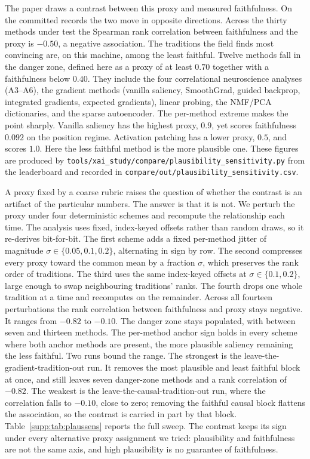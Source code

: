 The paper draws a contrast between this proxy and measured faithfulness. On the committed
records the two move in opposite directions. Across the thirty methods under test the Spearman
rank correlation between faithfulness and the proxy is $-0.50$, a negative association.
The traditions the field finds most convincing are, on this machine, among the least faithful.
Twelve methods fall in the danger zone, defined here as a proxy of at least $0.70$ together
with a faithfulness below $0.40$. They include the four correlational neuroscience analyses
(A3--A6), the gradient methods (vanilla saliency, SmoothGrad, guided backprop, integrated
gradients, expected gradients), linear probing, the NMF/PCA dictionaries, and the sparse
autoencoder. The per-method extreme
makes the point sharply. Vanilla saliency has the highest proxy, $0.9$, yet scores faithfulness
$0.092$ on the position regime. Activation patching has a lower proxy, $0.5$, and scores $1.0$.
Here the less faithful method is the more plausible one. These figures are produced by
\texttt{tools/xai\_study/compare/plausibility\_sensitivity.py} from the leaderboard and
recorded in \texttt{compare/out/plausibility\_sensitivity.csv}.

A proxy fixed by a coarse rubric raises the question of whether the contrast is an artifact of
the particular numbers. The answer is that it is not. We perturb the proxy under four
deterministic schemes and recompute the relationship each time. The analysis uses fixed,
index-keyed offsets rather than random draws, so it re-derives bit-for-bit. The first scheme
adds a fixed per-method jitter of magnitude $\sigma\in\{0.05,0.1,0.2\}$, alternating in sign by
row. The second compresses every proxy toward the common mean by a fraction $\sigma$, which
preserves the rank order of traditions. The third uses the same index-keyed offsets at
$\sigma\in\{0.1,0.2\}$, large enough to swap neighbouring traditions' ranks. The fourth drops
one whole tradition at a time and recomputes on the remainder. Across all fourteen
perturbations the rank correlation between faithfulness and proxy stays negative. It ranges
from $-0.82$ to $-0.10$. The danger zone stays populated, with
between seven and thirteen methods. The per-method anchor sign holds in every scheme where both
anchor methods are present, the more plausible saliency remaining the less faithful. Two runs
bound the range. The strongest is the leave-the-gradient-tradition-out run. It removes the most
plausible and least faithful block at once, and still leaves seven danger-zone methods and a rank
correlation of $-0.82$. The weakest is the leave-the-causal-tradition-out run, where the
correlation falls to $-0.10$, close to zero; removing the faithful causal block flattens the
association, so the contrast is carried in part by that block. Table~\ref{supp:tab:plaussens}
reports the full sweep. The contrast keeps its sign under every alternative proxy assignment we
tried: plausibility and faithfulness are not the same axis, and high plausibility is no
guarantee of faithfulness.

